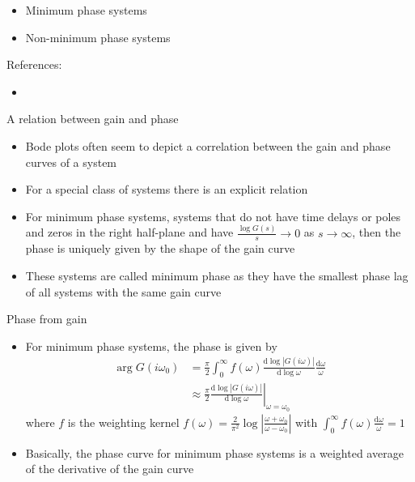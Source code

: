 \documentclass{beamer-control}
\begin{document}

\begin{SUMMARY}
\begin{itemize}
\item Minimum phase systems
\item Non-minimum phase systems
\end{itemize}
\vfill References:
\begin{itemize}
\item {}
\end{itemize}
\end{SUMMARY}




\begin{frame}{A relation between gain and phase}
\begin{itemize}
\item Bode plots often seem to depict a correlation between the gain and phase curves of a system
\item For a special class of systems there is an explicit relation
\item  For minimum phase systems, systems that do not have time delays or poles and zeros in the right half-plane and have $\tfrac{\log G(s)}{s}\rightarrow 0$ as $s\rightarrow \infty$, then the phase is uniquely given by the shape of the gain curve
\item These systems are called minimum phase as they have the smallest phase lag of all systems with the same gain curve
\end{itemize}
\end{frame}


\begin{frame}{Phase from gain}
\begin{itemize}
\item For minimum phase systems, the phase is given by
\begin{align*}
\operatorname{arg}G(i\omega_0) &= \frac{\pi}{2}\int^\infty_0 f(\omega) \frac{\mathrm{d}\log |G(i\omega)|}{\mathrm{d}\log \omega} \frac{\mathrm{d}\omega}{\omega}\\
&\approx
\left. \frac{\pi}{2}\frac{\mathrm{d}\log |G(i\omega)|}{\mathrm{d}\log \omega}\right|_{\omega=\omega_0}
\end{align*}
where $f$ is the weighting kernel $f(\omega)=\frac{2}{\pi^2} \log \left|\frac{\omega+\omega_0}{\omega-\omega_0}\right|$ with $\int^\infty_0 f(\omega)\frac{\mathrm{d}\omega}{\omega}=1$
\item Basically, the phase curve for minimum phase systems is a weighted average of the derivative of the gain curve
\end{itemize}
\end{frame}
\end{document}
